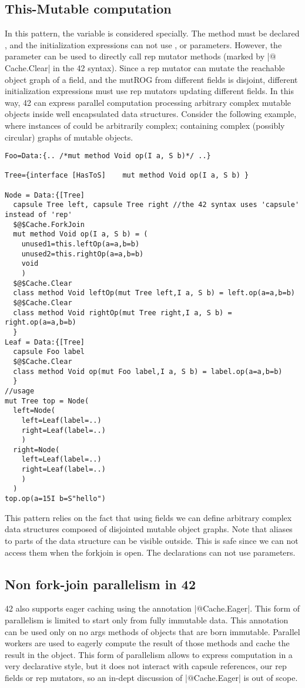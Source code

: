 \subsection*{This-Mutable computation}
In this pattern, the \Q@this@ variable is considered specially.
The method must be declared \Q@mut@, and the 
initialization expressions can not
use \Q@mut@, \Q@lent@ or \Q@read@ parameters.
However, the \Q@mut@ parameter \Q@this@ can be used to directly call
rep mutator methods (marked by \Q|$@$Cache.Clear| in the 42 syntax).
Since a rep mutator can mutate the reachable object graph of a \Q@rep@ field, and the mutROG from different \Q@rep@ fields is disjoint, 
different initialization expressions must use rep mutators updating different \Q@rep@ fields.
In this way, 42 can express parallel computation processing arbitrary complex mutable objects inside well encapsulated data structures.
Consider the following example, where instances of \Q@Foo@ could be arbitrarily complex; containing complex (possibly circular) graphs of mutable objects.
\begin{lstlisting}[deletekeywords=label]
Foo=Data:{.. /*mut method Void op(I a, S b)*/ ..}

Tree={interface [HasToS]    mut method Void op(I a, S b) }

Node = Data:{[Tree] 
  capsule Tree left, capsule Tree right //the 42 syntax uses 'capsule' instead of 'rep'
  $@$Cache.ForkJoin
  mut method Void op(I a, S b) = (
    unused1=this.leftOp(a=a,b=b)
    unused2=this.rightOp(a=a,b=b)
    void
    )
  $@$Cache.Clear
  class method Void leftOp(mut Tree left,I a, S b) = left.op(a=a,b=b)
  $@$Cache.Clear
  class method Void rightOp(mut Tree right,I a, S b) = right.op(a=a,b=b)
  }
Leaf = Data:{[Tree]
  capsule Foo label
  $@$Cache.Clear
  class method Void op(mut Foo label,I a, S b) = label.op(a=a,b=b)
  }
//usage
mut Tree top = Node(
  left=Node(
    left=Leaf(label=..)
    right=Leaf(label=..)
    )
  right=Node(
    left=Leaf(label=..)
    right=Leaf(label=..)
    )
  )
top.op(a=15I b=S"hello")
\end{lstlisting}

This pattern relies on the fact that using \Q@rep@ fields we can define arbitrary complex data structures composed of disjointed mutable object graphs.
Note that \Q@read@ aliases to parts of the data structure can be visible outside.
This is safe since we can not access them when the forkjoin is open. The declarations can not use \Q@read@ parameters.

\subsection*{Non fork-join parallelism in 42}
42 also supports eager caching using the annotation \Q|$@$Cache.Eager|.
This form of parallelism is limited to start only from fully immutable data.
This annotation can be used only on no args methods of objects that are born immutable.
Parallel workers are used to eagerly compute the result of those methods and cache the result in the object.
This form of parallelism allows to express computation in a very declarative style, but it does not interact with capsule references, our rep fields or rep mutators, so an in-dept discussion of \Q|$@$Cache.Eager| is out of scope.

